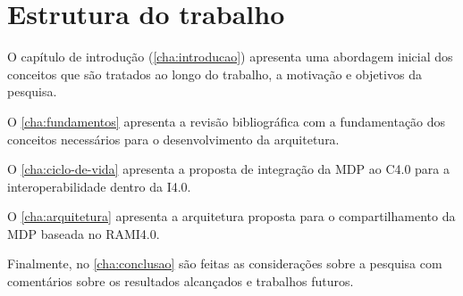 \section{Estrutura do trabalho}
\label{sec:estrutura}

O capítulo de introdução (\autoref{cha:introducao}) apresenta uma abordagem inicial dos conceitos que são tratados ao longo do trabalho, a motivação e objetivos da pesquisa.

O \autoref{cha:fundamentos} apresenta a revisão bibliográfica com a fundamentação dos conceitos necessários para o desenvolvimento da arquitetura.

O \autoref{cha:ciclo-de-vida} apresenta a proposta de integração da MDP ao C4.0 para a interoperabilidade dentro da I4.0.

O \autoref{cha:arquitetura} apresenta a arquitetura proposta para o compartilhamento da MDP baseada no RAMI4.0.

Finalmente, no \autoref{cha:conclusao} são feitas as considerações sobre a pesquisa com comentários sobre os resultados alcançados e trabalhos futuros.
